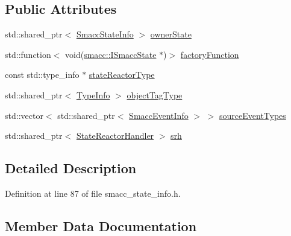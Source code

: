 \subsection*{Public Attributes}
\begin{DoxyCompactItemize}
\item 
std\+::shared\+\_\+ptr$<$ \hyperlink{classsmacc_1_1introspection_1_1SmaccStateInfo}{Smacc\+State\+Info} $>$ \hyperlink{structsmacc_1_1introspection_1_1SmaccStateReactorInfo_a7f79a42095ce284939ca47fb25a14101}{owner\+State}
\item 
std\+::function$<$ void(\hyperlink{classsmacc_1_1ISmaccState}{smacc\+::\+I\+Smacc\+State} $\ast$)$>$ \hyperlink{structsmacc_1_1introspection_1_1SmaccStateReactorInfo_a07d93f820f191aa3f9811fc2e1792b7a}{factory\+Function}
\item 
const std\+::type\+\_\+info $\ast$ \hyperlink{structsmacc_1_1introspection_1_1SmaccStateReactorInfo_a02de210fcdffd81424537d4d8a330609}{state\+Reactor\+Type}
\item 
std\+::shared\+\_\+ptr$<$ \hyperlink{classsmacc_1_1introspection_1_1TypeInfo}{Type\+Info} $>$ \hyperlink{structsmacc_1_1introspection_1_1SmaccStateReactorInfo_ae76d3acd0f68e75051ed002f10539738}{object\+Tag\+Type}
\item 
std\+::vector$<$ std\+::shared\+\_\+ptr$<$ \hyperlink{structsmacc_1_1introspection_1_1SmaccEventInfo}{Smacc\+Event\+Info} $>$ $>$ \hyperlink{structsmacc_1_1introspection_1_1SmaccStateReactorInfo_a66cb20b15e0ad0fbfd5ad20b83462eb6}{source\+Event\+Types}
\item 
std\+::shared\+\_\+ptr$<$ \hyperlink{classsmacc_1_1introspection_1_1StateReactorHandler}{State\+Reactor\+Handler} $>$ \hyperlink{structsmacc_1_1introspection_1_1SmaccStateReactorInfo_a0d28653e507c3f4498475987d5916f76}{srh}
\end{DoxyCompactItemize}


\subsection{Detailed Description}


Definition at line 87 of file smacc\+\_\+state\+\_\+info.\+h.



\subsection{Member Data Documentation}
\mbox{\label{structsmacc_1_1introspection_1_1SmaccStateReactorInfo_a07d93f820f191aa3f9811fc2e1792b7a}} 
